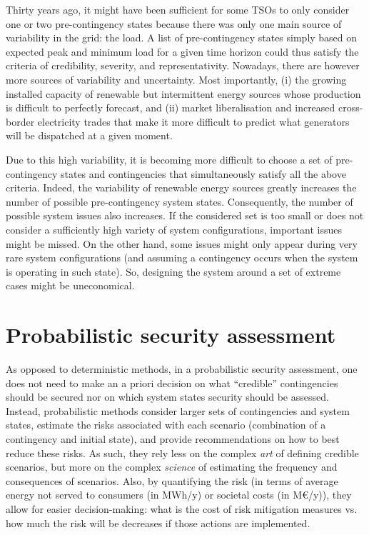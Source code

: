 \begin{itemize}
\begin{itemize}
    \end{itemize}
    Thirty years ago, it might have been sufficient for some TSOs to only consider one or two pre-contingency states because there was only one main source of variability in the grid: the load. A list of pre-contingency states simply based on expected peak and minimum load for a given time horizon could thus satisfy the criteria of credibility, severity, and representativity. Nowadays, there are however more sources of variability and uncertainty. Most importantly, (i) the growing installed capacity of renewable but intermittent energy sources whose production is difficult to perfectly forecast, and (ii) market liberalisation and increased cross-border electricity trades that make it more difficult to predict what generators will be dispatched at a given moment.

    Due to this high variability, it is becoming more difficult to choose a set of pre-contingency states and contingencies that simultaneously satisfy all the above criteria. Indeed, the variability of renewable energy sources greatly increases the number of possible pre-contingency system states. Consequently, the number of possible system issues also increases. If the considered set is too small or does not consider a sufficiently high variety of system configurations, important issues might be missed. On the other hand, some issues might only appear during very rare system configurations (and assuming a contingency occurs when the system is operating in such state). So, designing the system around a set of extreme cases might be uneconomical.
\end{itemize}


\section{Probabilistic security assessment}
\label{sec:probabilisticSecurity}

As opposed to deterministic methods, in a probabilistic security assessment, one does not need to make an a priori decision on what ``credible'' contingencies should be secured nor on which system states security should be assessed. Instead, probabilistic methods consider larger sets of contingencies and system states, estimate the risks associated with each scenario (combination of a contingency and initial state), and provide recommendations on how to best reduce these risks. As such, they rely less on the complex \emph{art} of defining credible scenarios, but more on the complex \emph{science} of estimating the frequency and consequences of scenarios. Also, by quantifying the risk (in terms of average energy not served to consumers (in MWh/y) or societal costs (in M€/y)), they allow for easier decision-making: what is the cost of risk mitigation measures vs. how much the risk will be decreases if those actions are implemented.

